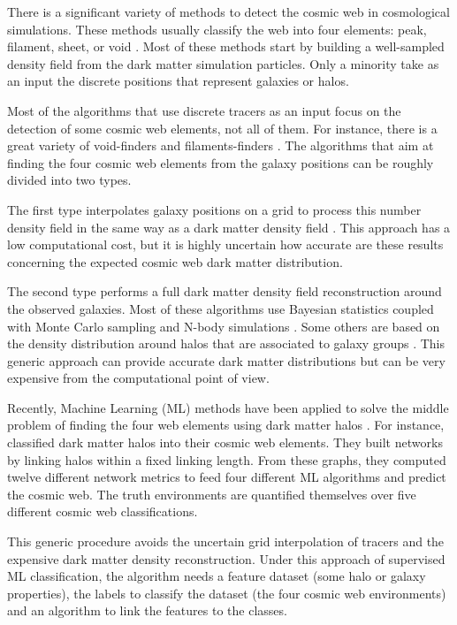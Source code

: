 \documentclass[usenatbib]{mnras}
\begin{document}
There is a significant variety of methods to detect
the cosmic web in cosmological simulations.
These methods usually classify the web into four
elements: peak, filament, sheet, or void \citep{Libeskind2018}.
Most of these methods start by building a well-sampled density field
from the dark matter simulation particles.
Only a minority take as an input the discrete positions that
represent galaxies or halos.

Most of the algorithms that use discrete tracers as an input focus on
the detection of some cosmic web elements, not all of them. 
For instance, there is a great variety of void-finders
\citep{Platen2007,Neyrinck2008} and filaments-finders
\citep{Novikov2003,Zhang2009,Sousbie2010,Chen2015,Luber2019}.   
The algorithms that aim at finding the four cosmic web elements from
the galaxy positions can be roughly divided into two types.

The first type interpolates galaxy positions on a grid to process
this number density field in the same way as a dark matter density
field \citep{Eardley2015,Alpaslan2016,Tojeiro2017,Shadab2019}.
This approach has a low computational cost, but it is highly uncertain
how accurate are these results concerning the expected cosmic
web dark matter distribution.

The second type performs a full dark matter density field
reconstruction around the observed galaxies.
Most of these algorithms use Bayesian statistics coupled with Monte
Carlo sampling and N-body
simulations \citep{Jasche2010,Jasche2013a,Bos2014,LeclercqJasche2015,Horowitz2019,Burchett2020}. 
Some others are based on the density distribution around halos that
are associated to galaxy groups \citep{Wang2009,Munoz-Cuartas2011}.
This generic approach can provide accurate dark matter distributions but can
be very expensive from the computational point of view.

Recently, Machine Learning (ML) methods 
have been applied to solve the middle problem 
of finding the four web elements using dark matter halos \citep{Hui2018, Tsizh2019}.
For instance, 
\citep{Tsizh2019} classified dark matter halos 
into their cosmic web elements. 
They built networks by linking halos within a fixed linking length. 
From these graphs, 
they computed twelve different network metrics 
to feed four different ML algorithms and predict the cosmic web. The truth environments are quantified themselves over five different cosmic web classifications.

This generic procedure avoids the uncertain grid interpolation of
tracers and the expensive dark matter density reconstruction. 
Under this approach of supervised ML classification, 
the algorithm needs a feature dataset (some halo or galaxy
properties), the labels to classify the dataset (the four cosmic web
environments) and an algorithm to link the features to the classes.
\end{document}
